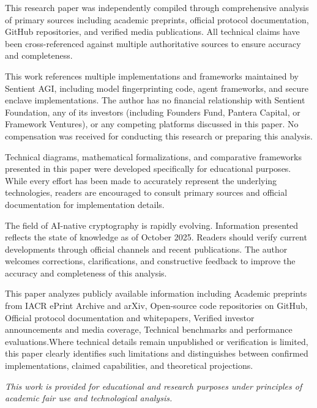 \documentclass[12pt,a4paper]{article}
\begin{document}
\noindent
This research paper was independently compiled through comprehensive analysis of primary sources including academic preprints, official protocol documentation, GitHub repositories, and verified media publications. All technical claims have been cross-referenced against multiple authoritative sources to ensure accuracy and completeness.

\vspace{0.5cm}

\noindent
This work references multiple implementations and frameworks maintained by Sentient AGI, including model fingerprinting code, agent frameworks, and secure enclave implementations. The author has no financial relationship with Sentient Foundation, any of its investors (including Founders Fund, Pantera Capital, or Framework Ventures), or any competing platforms discussed in this paper. No compensation was received for conducting this research or preparing this analysis.

\vspace{0.5cm}

\noindent
Technical diagrams, mathematical formalizations, and comparative frameworks presented in this paper were developed specifically for educational purposes. While every effort has been made to accurately represent the underlying technologies, readers are encouraged to consult primary sources and official documentation for implementation details.

\vspace{0.5cm}

\noindent
The field of AI-native cryptography is rapidly evolving. Information presented reflects the state of knowledge as of October 2025. Readers should verify current developments through official channels and recent publications. The author welcomes corrections, clarifications, and constructive feedback to improve the accuracy and completeness of this analysis.

\vspace{0.5cm}

\noindent
This paper analyzes publicly available information including Academic preprints from IACR ePrint Archive and arXiv, Open-source code repositories on GitHub, Official protocol documentation and whitepapers, Verified investor announcements and media coverage, Technical benchmarks and performance evaluations.Where technical details remain unpublished or verification is limited, this paper clearly identifies such limitations and distinguishes between confirmed implementations, claimed capabilities, and theoretical projections.


\vspace{1.5cm}

\begin{center}
\textit{This work is provided for educational and research purposes under principles of academic fair use and technological analysis.}
\end{center}
\end{document}
